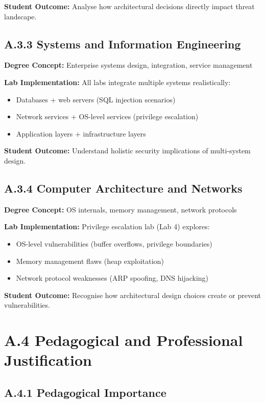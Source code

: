 \textbf{Student Outcome:} Analyse how architectural decisions directly impact threat landscape.


\subsection*{A.3.3 Systems and Information Engineering}


\textbf{Degree Concept:} Enterprise systems design, integration, service management

\textbf{Lab Implementation:} All labs integrate multiple systems realistically:
\begin{itemize}
    \item Databases + web servers (SQL injection scenarios)
    \item Network services + OS-level services (privilege escalation)
    \item Application layers + infrastructure layers
\end{itemize}

\textbf{Student Outcome:} Understand holistic security implications of multi-system design.


\subsection*{A.3.4 Computer Architecture and Networks}


\textbf{Degree Concept:} OS internals, memory management, network protocols

\textbf{Lab Implementation:} Privilege escalation lab (Lab 4) explores:
\begin{itemize}
    \item OS-level vulnerabilities (buffer overflows, privilege boundaries)
    \item Memory management flaws (heap exploitation)
    \item Network protocol weaknesses (ARP spoofing, DNS hijacking)
\end{itemize}

\textbf{Student Outcome:} Recognise how architectural design choices create or prevent vulnerabilities.


\section*{A.4 Pedagogical and Professional Justification}


\subsection*{A.4.1 Pedagogical Importance}


